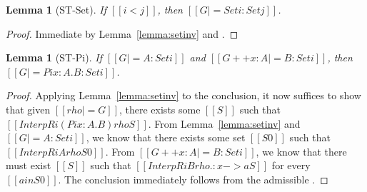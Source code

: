 \documentclass[\ifpublic nolinenum\else\fi,online,OA]{jfp}
\newcommand{\scw}[1]{}
\newtheorem{lemma}[theorem]{Lemma}
\theoremstyle{definition}
\begin{document}

\begin{lemma}[ST-Set]
  \label{lemma:stset}
  If $[[i < j]]$, then $[[G |= Set i : Set j]]$.
\end{lemma}
\begin{proof}
  Immediate by Lemma~\ref{lemma:setinv} and .
\end{proof}

\begin{lemma}[ST-Pi]
  \label{lemma:stpi}
  If $[[G |= A : Set i]]$ and $[[G ++ x  : A |= B : Set i]]$, then $[[G |= Pi
  x : A . B : Set i]]$.
\end{lemma}
\begin{proof}
  Applying Lemma~\ref{lemma:setinv} to the
  conclusion, it now suffices to show that given $[[rho |= G]]$, there
  exists some $[[S]]$ such that $[[InterpR i (Pi x : A . B){rho} S]]$.
  From Lemma~\ref{lemma:setinv} and $[[G |= A : Set i]]$, we know that
  there exists some set $[[S0]]$ such that $[[InterpR i A {rho} S0]]$.
From $[[G ++ x : A |= B : Set i]]$, we know that there must
exist $[[S]]$ such that $[[InterpR i B {rho .: x -> a} S]]$ for every $[[a
in S0]]$. The conclusion immediately follows from the admissible .
\end{proof}
\end{document}
